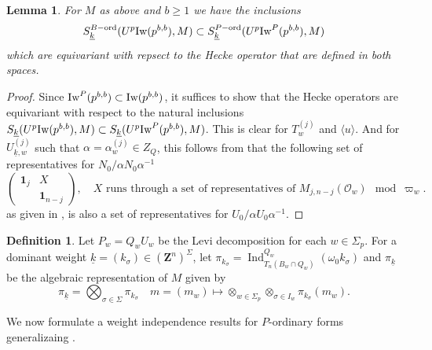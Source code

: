 \documentclass[leqno]{amsart}
\newcommand{\wt}[1]{\underline{ #1 }}
\newcommand{\Iw}{\textnormal{Iw}}
\newcommand{\ord}{\textnormal{ord}}
\newcommand{\id}{\mathbf{1}}
\newcommand{\Z}{{\mathbf{Z}}}
\newcommand{\oo}{\mathcal{O}} %
\DeclareMathOperator{\Ind}{Ind}
\newtheorem{lem}[thm]{Lemma}
\theoremstyle{definition}
\newtheorem{defn}[thm]{Definition}
\theoremstyle{remark}
\begin{document}
\begin{lem}
	For $M$ as above and $b\geq 1$ we have the inclusions 
	\begin{equation*}
		S_{\wt{k}}^{B-\ord}(U^p\Iw(p^{b,b}),M)\subset
		S_{\wt{k}}^{P-\ord}(U^p\Iw^P(p^{b,b}),M)
	\end{equation*}
	which are equivariant with repsect to the 
	Hecke operator that are defined in both spaces.
\end{lem}
\begin{proof}
	Since $\Iw^P(p^{b,b})\subset \Iw(p^{b,b})$,
	it suffices to show that the Hecke operators 
	are equivariant with respect to the natural inclusions
	$S_{\wt{k}}(U^p\Iw(p^{b,b}),M)\subset S_{\wt{k}}(U^p\Iw^P(p^{b,b}),M)$.
	This is clear for $T_w^{(j)}$ and $\langle u\rangle$.
	And for  $U_{\wt{k},w}^{(j)}$ such that 
	$\alpha=\alpha_w^{(j)}\in Z_Q$, this follows from that 
	the following set of representatives for $N_0/\alpha N_0\alpha^{-1}$
	\[
	\begin{pmatrix}
		\id_j&X\\&\id_{n-j}
	\end{pmatrix},\quad
	X \text{ runs through a set of representatives of }
	M_{j,n-j}(\oo_w)\mod \varpi_w.
	\]
	as given in \cite[Lem 2.10]{ger}, is also
	a set of representatives for $U_0/\alpha U_0\alpha^{-1}$.
\end{proof}


\begin{defn}
	Let $P_w=Q_wU_w$ be the Levi decomposition  for each  $w\in \Sigma_p$.
	For a dominant weight 
	$\wt{k}=(k_\sigma)\in (\Z^n)^{\Sigma}$,
	let $\pi_{k_\sigma}=\Ind_{T_n(B_w\cap Q_w)}^{Q_w}(\omega_0 k_\sigma)$
	and $\pi_{\wt{k}}$ be the algebraic representation of $M$ given by
	\[
		\pi_{\wt{k}}=\bigotimes_{\sigma\in \Sigma}\pi_{k_\sigma}\quad
		m=(m_w)\mapsto 
		\otimes_{w\in \Sigma_p}\otimes_{\sigma\in I_w}
		\pi_{k_\sigma}(m_w).
	\]
\end{defn}

We now formulate a weight independence results 
for $P$-ordinary forms
generalizaing \cite[Prop 2.22]{ger}.
\end{document}
